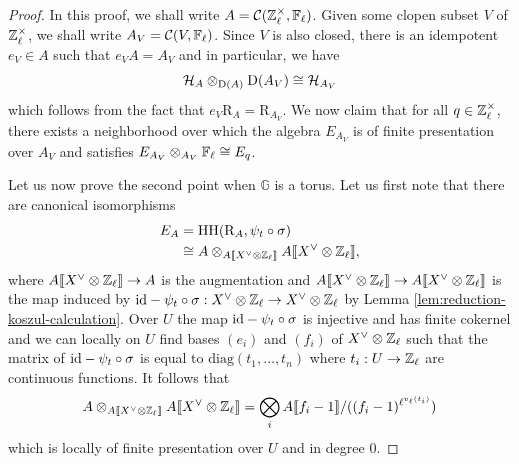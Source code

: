 \documentclass[a4paper, 10pt, oneside, reqno]{amsart}
\theoremstyle{plain}
\theoremstyle{definition}
\theoremstyle{remark}
\newcommand{\Gbb}{\mathbb{G}}
\newcommand{\RR}{\mathrm{R}}
\newcommand{\HHH}{\mathrm{HH}}
\begin{document}
\begin{proof}
In this proof, we shall write $A = \mathcal{C}(\mathbb{Z}_{\ell}^{\times}, \mathbb{F}_{\ell})$. Given some clopen subset $V$ of $\mathbb{Z}_{\ell}^{\times}$, we shall write $A_V = \mathcal{C}(V, \mathbb{F}_{\ell})$. Since $V$ is also closed, there is an idempotent $e_V \in A$ such that $e_VA = A_V$ and in particular, we have 
$$\mathcal{H}_{A} \otimes_{\mathrm{D}(A)} \mathrm{D}(A_V) \cong \mathcal{H}_{A_V}$$
which follows from the fact that $e_V\RR_A = \RR_{A_V}$. We now claim that for all $q \in \mathbb{Z}_{\ell}^{\times}$, there exists a neighborhood over which the algebra $E_{A_V}$ is of finite presentation over $A_V$ and satisfies $E_{A_V} \otimes_{A_V} \mathbb{F}_{\ell} \cong E_q$.

Let us now prove the second point when $\Gbb$ is a torus. Let us first note that there are canonical isomorphisms
\begin{align*}
E_A &= \HHH(\RR_A, \psi_t \circ \sigma) \\
&\cong A \otimes_{A\llbracket X^{\vee} \otimes \Zl \rrbracket} A\llbracket X^{\vee} \otimes \Zl \rrbracket,
\end{align*}
where $A\llbracket X^{\vee} \otimes \mathbb{Z}_{\ell} \rrbracket \to A$ is the augmentation and $A\llbracket X^{\vee} \otimes \mathbb{Z}_{\ell} \rrbracket \to A\llbracket X^{\vee} \otimes \mathbb{Z}_{\ell} \rrbracket$ is the map induced by $\mathrm{id} - \psi_t\circ\sigma : X^{\vee} \otimes \mathbb{Z}_{\ell} \to X^{\vee} \otimes \mathbb{Z}_{\ell}$ by Lemma \ref{lem:reduction-koszul-calculation}. Over $U$ the map $\mathrm{id} - \psi_t\circ\sigma$ is injective and has finite cokernel and we can locally on $U$ find bases $(e_i)$ and $(f_i)$ of $X^{\vee} \otimes \mathbb{Z}_{\ell}$ such that the matrix of $\mathrm{id} - \psi_t\circ\sigma$ is equal to $\mathrm{diag}(t_1,\dots,t_n)$ where $t_i : U \to \mathbb{Z}_{\ell}$ are continuous functions. It follows that 
$$ A \otimes_{A\llbracket X^{\vee} \otimes \mathbb{Z}_{\ell} \rrbracket} A\llbracket X^{\vee} \otimes \mathbb{Z}_{\ell} \rrbracket = \bigotimes_i A\llbracket f_i - 1 \rrbracket/((f_i - 1)^{\ell^{v_{\ell}(t_i)}})$$
which is locally of finite presentation over $U$ and in degree $0$. 


\end{proof}
\end{document}
